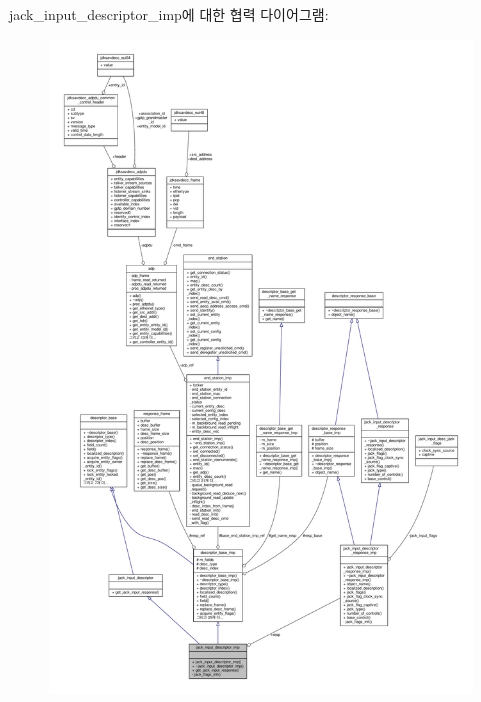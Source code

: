 jack\+\_\+input\+\_\+descriptor\+\_\+imp에 대한 협력 다이어그램\+:
\nopagebreak
\begin{figure}[H]
\begin{center}
\leavevmode
\includegraphics[width=350pt]{classavdecc__lib_1_1jack__input__descriptor__imp__coll__graph}
\end{center}
\end{figure}
